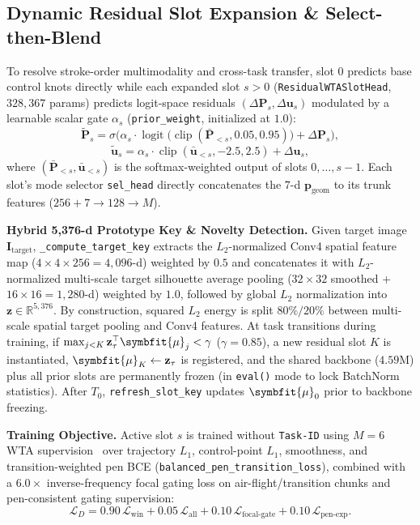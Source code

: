 \documentclass[10pt,twocolumn]{article}
\begin{document}
\subsection{Dynamic Residual Slot Expansion \& Select-then-Blend}
To resolve stroke-order multimodality and cross-task transfer, slot $0$ predicts base control knots directly while each expanded slot $s > 0$ (\texttt{ResidualWTASlotHead}, $328{,}367$ params) predicts logit-space residuals $(\Delta \mathbf{P}_s, \Delta \mathbf{u}_s)$ modulated by a learnable scalar gate $\alpha_s$ (\texttt{prior\_weight}, initialized at $1.0$):
\begin{equation}
    \tilde{\mathbf{P}}_s = \sigma\!\Big(\alpha_s \cdot \operatorname{logit}\big(\operatorname{clip}(\bar{\mathbf{P}}_{<s}, 0.05, 0.95)\big) + \Delta \mathbf{P}_s\Big), \label{eq:res_p}
\end{equation}
\begin{equation}
    \tilde{\mathbf{u}}_s = \alpha_s \cdot \operatorname{clip}(\bar{\mathbf{u}}_{<s}, -2.5, 2.5) + \Delta \mathbf{u}_s, \label{eq:res_u}
\end{equation}
where $(\bar{\mathbf{P}}_{<s}, \bar{\mathbf{u}}_{<s})$ is the softmax-weighted output of slots $0, \dots, s-1$. Each slot's mode selector \texttt{sel\_head} directly concatenates the $7$-d $\mathbf{p}_{\text{geom}}$ to its trunk features ($256 + 7 \rightarrow 128 \rightarrow M$).

\textbf{Hybrid 5,376-d Prototype Key \& Novelty Detection.} Given target image $\mathbf{I}_{\text{target}}$, \texttt{\_compute\_target\_key} extracts the $L_2$-normalized Conv4 spatial feature map ($4\times 4 \times 256 = 4{,}096$-d) weighted by $0.5$ and concatenates it with $L_2$-normalized multi-scale target silhouette average pooling ($32\times 32$ smoothed + $16\times 16 = 1{,}280$-d) weighted by $1.0$, followed by global $L_2$ normalization into $\mathbf{z} \in \mathbb{R}^{5{,}376}$. By construction, squared $L_2$ energy is split $80\% / 20\%$ between multi-scale spatial target pooling and Conv4 features. At task transitions during training, if $\max_{j < K} \mathbf{z}_\tau^\top \symbfit{\mu}_j < \gamma$ ($\gamma = 0.85$), a new residual slot $K$ is instantiated, $\symbfit{\mu}_K \leftarrow \mathbf{z}_\tau$ is registered, and the shared backbone ($4.59\text{M}$) plus all prior slots are permanently frozen (in \texttt{eval()} mode to lock BatchNorm statistics). After $T_0$, \texttt{refresh\_slot\_key} updates $\symbfit{\mu}_0$ prior to backbone freezing.

\textbf{Training Objective.} Active slot $s$ is trained without \texttt{Task-ID} using $M=6$ WTA supervision~\cite{rupprecht2017} over trajectory $L_1$, control-point $L_1$, smoothness, and transition-weighted pen BCE (\texttt{balanced\_pen\_transition\_loss}), combined with a $6.0\times$ inverse-frequency focal gating loss on air-flight/transition chunks and pen-consistent gating supervision:
\begin{equation}
    \mathcal{L}_D = 0.90\,\mathcal{L}_{\text{win}} + 0.05\,\mathcal{L}_{\text{all}} + 0.10\,\mathcal{L}_{\text{focal-gate}} + 0.10\,\mathcal{L}_{\text{pen-exp}}.
\end{equation}
\end{document}

